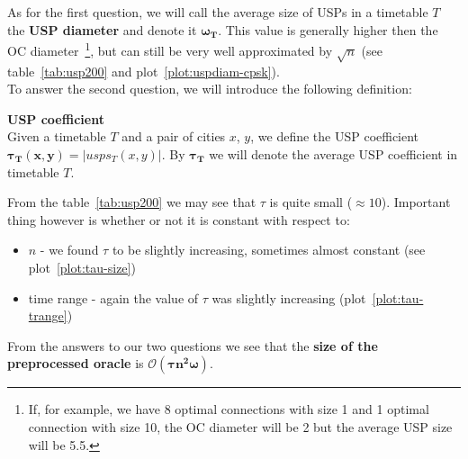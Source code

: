 		\noindent As for the first question, we will call the average size of USPs in a timetable $T$ the \textbf{USP diameter} and denote it $\bm{\omega_{T}}$. This value is generally higher then the OC diameter~\footnote{If, for example, we have 8 optimal connections with size 1 and 1 optimal connection with size 10, the OC diameter will be 2 but the average USP size will be 5.5.}, but can still be very well approximated by $\sqrt{n}$ (see table~\ref{tab:usp200} and plot~\ref{plot:uspdiam-cpsk}). \\
		
		\noindent To answer the second question, we will introduce the following definition:
		
		\begin{definition}
	        \textbf{USP coefficient} \\
			Given a timetable $T$ and a pair of cities $x$, $y$, we define the USP coefficient $\bm{\tau_{T}(x, y)} = |usps_{T}(x, y)|$. By $\bm{\tau_{T}}$ we will denote the average USP coefficient in timetable $T$.
	    \end{definition}
	    
	    \noindent From the table~\ref{tab:usp200} we may see that $\tau$ is quite small ($\approx 10$). Important thing however is whether or not it is constant with respect to:
		\begin{itemize}
			\item $n$ - we found $\tau$ to be slightly increasing, sometimes almost constant (see plot~\ref{plot:tau-size}) 
			\item time range - again the value of $\tau$ was slightly increasing (plot~\ref{plot:tau-trange})
		\end{itemize}
		\hspace{\fill}
		
		\noindent From the answers to our two questions we see that the \textbf{size of the preprocessed oracle} is $\bm{\mathcal{O}(\tau n^{2} \omega)}$.	    
	
